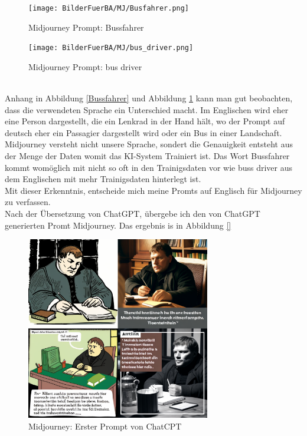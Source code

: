 \documentclass[10pt,a4paper,bibliography=totocnumbered,listof=totocnumbered]{scrartcl}
\begin{document}
\begin{figure}[h]
	\centering
	\begin{minipage}[t]{0.45\linewidth}
		\centering
		\texttt{[image: BilderFuerBA/MJ/Busfahrer.png]}
		\caption{Midjourney Prompt: Bussfahrer}
		\label{Bussfahrer}
	\end{minipage}
	\hfill
	\begin{minipage}[t]{0.45\linewidth}
		\centering
		\texttt{[image: BilderFuerBA/MJ/bus\_driver.png]}
		\caption{Midjourney Prompt: bus driver}
		\label{bus_driver}
	\end{minipage}
\end{figure}
\\
Anhang in Abbildung \ref{Bussfahrer} und Abbildung \ref{bus_driver} kann man gut beobachten, dass die verwendeten Sprache ein Unterschied macht. Im Englischen wird eher eine Person dargestellt, die ein Lenkrad in der Hand hält, wo der Prompt auf deutsch eher ein Passagier dargestellt wird oder ein Bus in einer Landschaft.
\\
Midjourney versteht nicht unsere Sprache, sondert die Genauigkeit entsteht aus der Menge der Daten womit das KI-System Trainiert ist. Das Wort Bussfahrer kommt womöglich mit nicht so oft in den Trainigsdaten vor wie buss driver aus dem Englischen mit mehr Trainigsdaten hinterlegt ist.
\\
Mit dieser Erkenntnis, entscheide mich meine Promts auf Englisch für Midjourney zu verfassen.
\\
Nach der Übersetzung von ChatGPT, übergebe ich den von ChatGPT generierten Promt Midjourney. Das ergebnis is in Abbildung \ref{}

\begin{figure}[h]
	\centering
	\includegraphics[width=8.022cm]{BilderFuerBA/MJ/MLaufEnglisch.png}
	\caption{Midjourney: Erster Prompt von ChatCPT}
	\label{Midjourney_erster_Prompt}
\end{figure}
\end{document}
